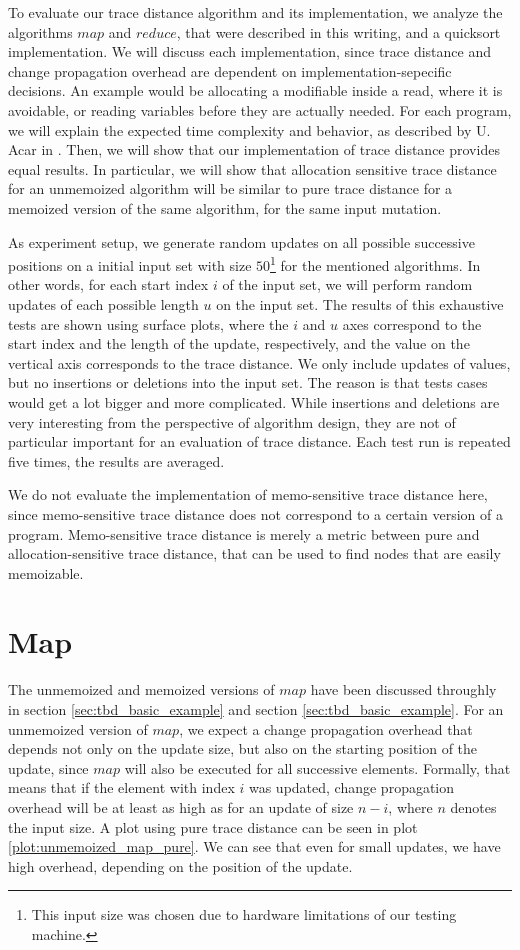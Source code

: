 To evaluate our trace distance algorithm and its implementation, we analyze the algorithms $map$ and $reduce$, that were described in this writing, and a quicksort implementation. We will discuss each implementation, since trace distance and change propagation overhead are dependent on implementation-sepecific decisions. An example would be allocating a modifiable inside a read, where it is avoidable, or reading variables before they are actually needed. For each program, we will explain the expected time complexity and behavior, as described by U. Acar in \cite{Acar2005thesis}. Then, we will show that our implementation of trace distance provides equal results. In particular, we will show that allocation sensitive trace distance for an unmemoized algorithm will be similar to pure trace distance for a memoized version of the same algorithm, for the same input mutation. 

As experiment setup, we generate random updates on all possible successive positions on a initial input set with size $50$\footnote{This input size was chosen due to hardware limitations of our testing machine.} for the mentioned algorithms. In other words, for each start index $i$ of the input set, we will perform random updates of each possible length $u$ on the input set. The results of this exhaustive tests are shown using surface plots, where the $i$ and $u$ axes correspond to the start index and the length of the update, respectively, and the value on the vertical axis corresponds to the trace distance. We only include updates of values, but no insertions or deletions into the input set. The reason is that tests cases would get a lot bigger and more complicated. While insertions and deletions are very interesting from the perspective of algorithm design, they are not of particular important for an evaluation of trace distance. Each test run is repeated five times, the results are averaged. 

We do not evaluate the implementation of memo-sensitive trace distance here, since memo-sensitive trace distance does not correspond to a certain version of a program. Memo-sensitive trace distance is merely a metric between pure and allocation-sensitive trace distance, that can be used to find nodes that are easily memoizable. 

\section{Map}

The unmemoized and memoized versions of $map$ have been discussed throughly in section \ref{sec:tbd_basic_example} and section \ref{sec:tbd_basic_example}. For an unmemoized version of $map$, we expect a change propagation overhead that depends not only on the update size, but also on the starting position of the update, since $map$ will also be executed for all successive elements. Formally, that means that if the element with index $i$ was updated, change propagation overhead will be at least as high as for an update of size $n-i$, where $n$ denotes the input size. A plot using pure trace distance can be seen in plot \ref{plot:unmemoized_map_pure}. We can see that even for small updates, we have high overhead, depending on the position of the update. 

